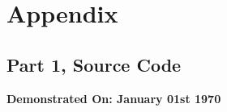 
\section{Appendix}\label{sec:appendix}
\begin{appendix}

    \section{Part 1, Source Code}\label{sec:part1_source}
        \bigbreak
        {
            \selectfont\footnotesize
            
        }

        \textbf{Demonstrated On: January 01st 1970}

\end{appendix}